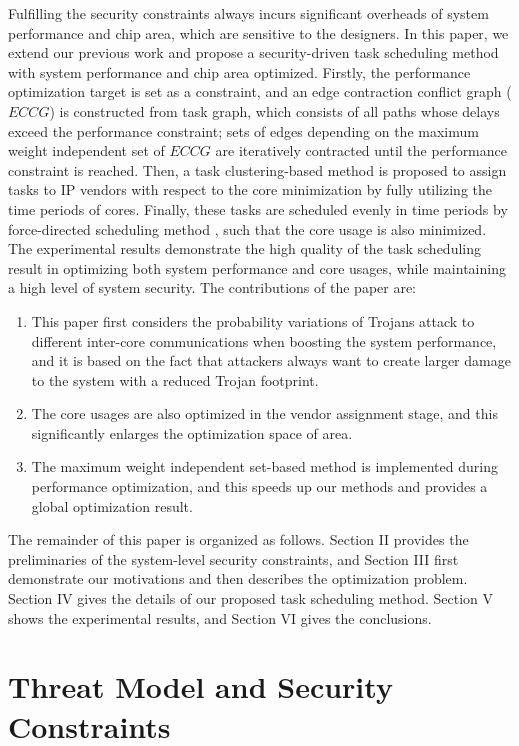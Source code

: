 \documentclass[10pt,journal]{IEEEtran}
\begin{document}
Fulfilling the security constraints always incurs significant overheads of system performance and chip area, which are sensitive to the designers. In this paper, we extend our previous work \cite{conference:NW} and propose a security-driven task scheduling method with system performance and chip area optimized. Firstly, the performance optimization target is set as a constraint, and an edge contraction conflict graph ($ECCG$) is constructed from task graph, which consists of all paths whose delays exceed the performance constraint; sets of edges depending on the maximum weight independent set of $ECCG$ are iteratively contracted until the performance constraint is reached. Then, a task clustering-based method is proposed to assign tasks to IP vendors with respect to the core minimization by fully utilizing the time periods of cores. Finally, these tasks are scheduled evenly in time periods by force-directed scheduling method \cite{article:PP}, such that the core usage is also minimized. The experimental results demonstrate the high quality of the task scheduling result in optimizing both system performance and core usages, while maintaining a high level of system security. The contributions of the paper are:

\begin{enumerate}
\item This paper first considers the probability variations of Trojans attack to different inter-core communications when boosting the system performance, and it is based on the fact that attackers always want to create larger damage to the system with a reduced Trojan footprint.
\item The core usages are also optimized in the vendor assignment stage, and this significantly enlarges the optimization space of area.
\item The maximum weight independent set-based method is implemented during performance optimization, and this speeds up our methods and provides a global optimization result.
\end{enumerate}

The remainder of this paper is organized as follows. Section II provides the preliminaries of the system-level security constraints, and Section III first demonstrate our motivations and then describes the optimization problem. Section IV gives the details of our proposed task scheduling method. Section V shows the experimental results, and Section VI gives the conclusions.

\section{Threat Model and Security Constraints}
\end{document}
